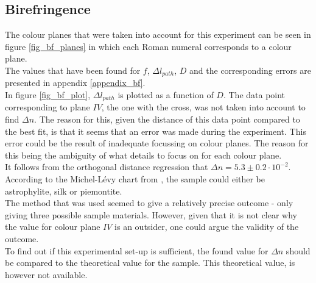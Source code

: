 \subsection{Birefringence}

The colour planes that were taken into account for this experiment can be seen in figure \ref{fig_bf_planes} in which each Roman numeral corresponds to a colour plane. \\
The values that have been found for $f$, $\Delta l_{path}$, $D$ and the corresponding errors are presented in appendix \ref{appendix_bf}.\\
In figure \ref{fig_bf_plot}, $\Delta l_{path}$ is plotted as a function of $D$. The data point corresponding to plane $IV$, the one with the cross, was not taken into account to find $\Delta n$. The reason for this, given the distance of this data point compared to the best fit, is that it seems that an error was made during the experiment. This error could be the result of inadequate focussing on colour planes. The reason for this being the ambiguity of what details to focus on for each colour plane.\\
It follows from the orthogonal distance regression that $\Delta n = 5.3 \pm 0.2 \cdot 10^{-2}$. According to the Michel-L\'evy chart from \cite{bf_chart}, the sample could either be astrophylite, silk or piemontite.\\
The method that was used seemed to give a relatively precise outcome - only giving three possible sample materials. However, given that it is not clear why the value for colour plane $IV$ is an outsider, one could argue the validity of the outcome. \\
To find out if this experimental set-up is sufficient, the found value for $\Delta n$ should be compared to the theoretical value for the sample. This theoretical value, is however not available.

